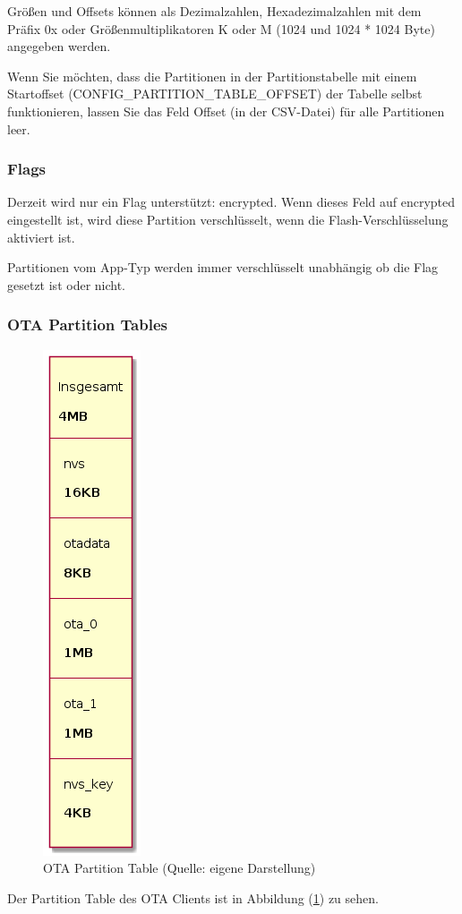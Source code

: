 Größen und Offsets können als Dezimalzahlen, Hexadezimalzahlen mit dem Präfix 0x oder Größenmultiplikatoren K oder M (1024 und 1024 * 1024 Byte) angegeben werden.

Wenn Sie möchten, dass die Partitionen in der Partitionstabelle mit einem Startoffset (CONFIG\_PARTITION\_TABLE\_OFFSET) der Tabelle selbst funktionieren, lassen Sie das Feld Offset (in der CSV-Datei) für alle Partitionen leer.

\subsubsection{Flags}
Derzeit wird nur ein Flag unterstützt: encrypted. Wenn dieses Feld auf encrypted eingestellt ist, wird diese Partition verschlüsselt, wenn die Flash-Verschlüsselung aktiviert ist.

Partitionen vom App-Typ werden immer verschlüsselt unabhängig ob die Flag gesetzt ist oder nicht.\cite{espressif_partition_tables}

\subsubsection{OTA Partition Tables}
\begin{figure}[H]
    \begin{center}
        \includegraphics[scale=0.7]{diagrams/ota_partition_table.png}
        \caption{OTA Partition Table (Quelle: eigene Darstellung)}
        \label{abb:ota_partition_table}
    \end{center}    
\end{figure}
Der Partition Table des OTA Clients ist in Abbildung (\ref{abb:ota_partition_table}) zu sehen.

